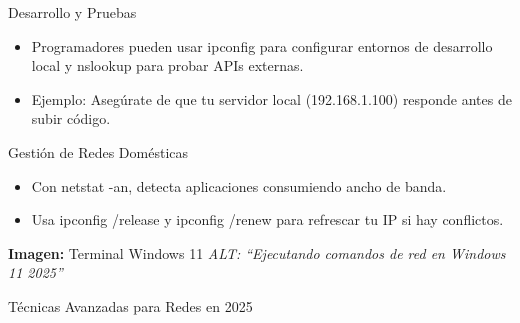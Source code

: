 \documentclass[
  doc,
  floatsintext,
  longtable,
  a4paper,
  nolmodern,
  notxfonts,
  notimes,
  12pt,
  colorlinks=true,linkcolor=blue,citecolor=blue,urlcolor=blue]{apa7}
\providecommand{\tightlist}{%
  \setlength{\itemsep}{0pt}\setlength{\parskip}{0pt}}
\begin{document}
Desarrollo y Pruebas

\begin{itemize}
\tightlist
\item
  Programadores pueden usar ipconfig para configurar entornos de
  desarrollo local y nslookup para probar APIs externas.
\item
  Ejemplo: Asegúrate de que tu servidor local (192.168.1.100) responde
  antes de subir código.
\end{itemize}

Gestión de Redes Domésticas

\begin{itemize}
\tightlist
\item
  Con netstat -an, detecta aplicaciones consumiendo ancho de banda.
\item
  Usa ipconfig /release y ipconfig /renew para refrescar tu IP si hay
  conflictos.
\end{itemize}

\textbf{Imagen:} Terminal Windows 11 \emph{ALT: ``Ejecutando comandos de
red en Windows 11 2025''}

Técnicas Avanzadas para Redes en 2025
\end{document}
